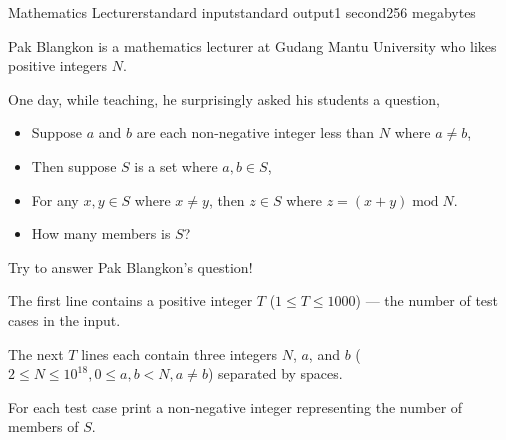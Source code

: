 \begin{problem}{Mathematics Lecturer}{standard input}{standard output}{1 second}{256 megabytes}

Pak Blangkon is a mathematics lecturer at Gudang Mantu University who likes positive integers $N$.

One day, while teaching, he surprisingly asked his students a question,
\begin{itemize}
\item Suppose $a$ and $b$ are each non-negative integer less than $N$ where $a \neq b$,
\item Then suppose $S$ is a set where $a,b\in{S}$,
\item For any $x,y \in S$ where $x \neq y$, then $z\in S$ where $z=(x+y)\operatorname{mod}N$.
\item How many members is $S$?
\end{itemize}

Try to answer Pak Blangkon's question!

\InputFile
The first line contains a positive integer $T$ ($1 \le T \le 1000$) --- the number of test cases in the input.

The next $T$ lines each contain three integers $N$, $a$, and $b$ ($2\leq{N}\leq{10^{18}}, 0 \le a,b<{N},a\neq{b}$) separated by spaces.

\OutputFile
For each test case print a non-negative integer representing the number of members of $S$.

\Example

\begin{example}
%
\end{example}

\end{problem}

